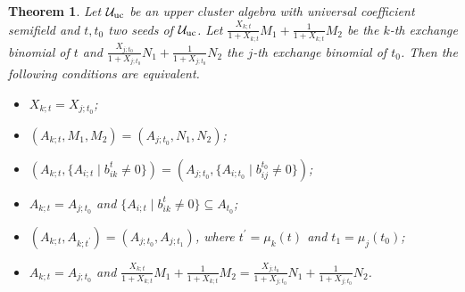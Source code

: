 \documentclass{amsart}
\newtheorem{theorem}{Theorem}[section]
\theoremstyle{definition}
\theoremstyle{remark}
\numberwithin{equation}{section}
\begin{document}
\begin{theorem}\label{mainthm}
Let $\mathcal U_{\rm uc}$ be an upper cluster algebra with universal coefficient semifield and $t, t_0$  two seeds of $\mathcal U_{\rm uc}$.
Let $\frac{X_{k;t}}{1+X_{k;t}}M_1+\frac{1}{1+X_{k;t}}M_2$ be the $k$-th exchange binomial of $t$ and $\frac{X_{j;t_0}}{1+X_{j;t_0}}N_1+\frac{1}{1+X_{j;t_0}}N_2$  the $j$-th exchange binomial of $t_0$. Then the following conditions are equivalent.

\begin{itemize}
\item[(i)] $X_{k;t}=X_{j;t_0}$;

\item[(ii)] $(A_{k;t}, M_1, M_2)=(A_{j;t_0}, N_1, N_2)$;



\item[(iii)] $(A_{k;t},\{A_{i;t}\mid b_{ik}^t\neq 0\})=(A_{j;t_0},\{A_{i;t_0}\mid b_{ij}^{t_0}\neq 0\})$;

\item[(iv)] $A_{k;t}=A_{j;t_0}$ and $\{A_{i;t}\mid b_{ik}^t\neq 0\}\subseteq A_{t_0}$;

\item[(v)] $(A_{k;t},A_{k;t^\prime})=(A_{j;t_0},A_{j;t_1})$, where $t^\prime=\mu_k(t)$ and $t_1=\mu_j(t_0)$;

\item[(vi)] $A_{k;t}=A_{j;t_0}$ and $\frac{X_{k;t}}{1+X_{k;t}}M_1+\frac{1}{1+X_{k;t}}M_2=\frac{X_{j;t_0}}{1+X_{j;t_0}}N_1+\frac{1}{1+X_{j;t_0}}N_2$.
\end{itemize}
\end{theorem}
\end{document}
